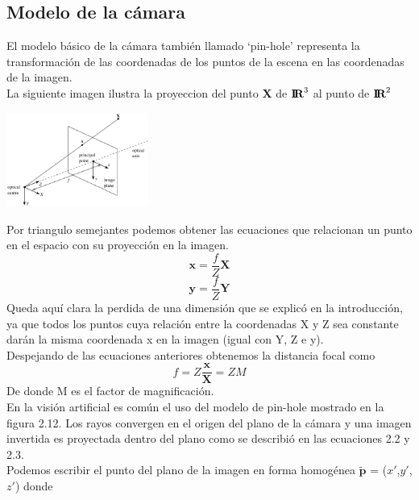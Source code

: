 \subsection{Modelo de la cámara}
El modelo básico de la cámara también llamado
‘pin-hole’ representa la transformación de las
coordenadas de los puntos de la escena en las
coordenadas de la imagen. \cite{Paper::Ricolfe2008}\\
La siguiente imagen ilustra la proyeccion del punto \textbf{X} de ${\textbf{I\!R}^3}$ al punto 
de ${\textbf{I\!R}^2}$
\begin{center}
	\includegraphics[width=0.35\textwidth]{Contenido/Cuerpo/Capitulo2/Fig19.eps}
	\label{fig:MarcoTeorico:Fig11}
\end{center}
Por triangulo semejantes podemos obtener las ecuaciones que relacionan un punto en el espacio con
su proyección en la imagen.
\begin{equation}
	\textbf{x} = \frac{f}{Z}\textbf{X}
\end{equation}
\begin{equation}
	\textbf{y} = \frac{f}{Z}\textbf{Y}
\end{equation}
Queda aquí clara la perdida de una dimensión que se explicó en la introducción,
ya que todos los puntos cuya relación entre la coordenadas X y Z sea constante darán la
misma coordenada x en la imagen (igual con Y, Z e y).\cite{Book:Jose2005}\\
Despejando de las ecuaciones anteriores obtenemos la distancia focal como
\begin{equation}
	f = Z \frac{\textbf{x}}{\textbf{X}}=ZM
\end{equation}
De donde M es el factor de magnificación.\\
En la visión artificial es común el uso del modelo de pin-hole mostrado en la figura 2.12. Los rayos convergen en el origen
del plano de la cámara y una imagen invertida es proyectada dentro del plano como se describió en las ecuaciones 2.2 y 2.3.\\
Podemos escribir el punto del plano de la imagen en forma homogénea $\tilde{\textbf{p}}$ = ($x'$,$y'$,$z'$) donde
